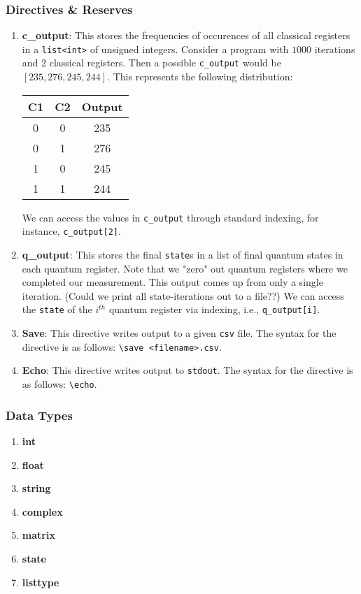 \documentclass{article}
\begin{document}
\subsubsection{Directives \& Reserves}
\begin{enumerate}
	\item \textbf{c\_output}:
		This stores the frequencies of occurences of all classical registers in a \texttt{list<int>} of unsigned integers. Consider a program with $1000$ iterations and 2 classical registers. Then a possible \texttt{c\_output} would be $[235, 276, 245, 244]$. This represents the following distribution:
		\begin{center}
			\begin{tabular}{||c c c||} 
			\hline
			C1 & C2 & Output \\ [0.5ex] 
			\hline\hline
			0 & 0 & 235 \\ 
			\hline
			0 & 1 & 276 \\
			\hline
			1 & 0 & 245 \\
			\hline
			1 & 1 & 244 \\ [1ex] 
			\hline
			\end{tabular}
		\end{center}	
		We can access the values in \texttt{c\_output} through standard indexing, for instance, \texttt{c\_output[2]}.
	\item \textbf{q\_output}:
		This stores the final \texttt{state}s in a list of final quantum states in each quantum register. Note that we "zero" out quantum registers where we completed our measurement. This output comes up from only a single iteration. (Could we print all state-iterations out to a file??) We can access the \texttt{state} of the $i^{th}$ quantum register via indexing, i.e., \texttt{q\_output[i]}.
	\item \textbf{Save}:
		This directive writes output to a given \texttt{csv} file. The syntax for the directive is as follows: \texttt{\textbackslash save <filename>.csv}.
	\item \textbf{Echo}:
		This directive writes output to \texttt{stdout}. The syntax for the directive is as follows: \texttt{\textbackslash echo}.
\end{enumerate}

\subsubsection{Data Types}
\begin{enumerate}
	\item \textbf{int}
	\item \textbf{float}
	\item \textbf{string}
	\item \textbf{complex}
	\item \textbf{matrix}
	\item \textbf{state}
	\item \textbf{list\textlangle type\textrangle}
\end{enumerate}
\end{document}
